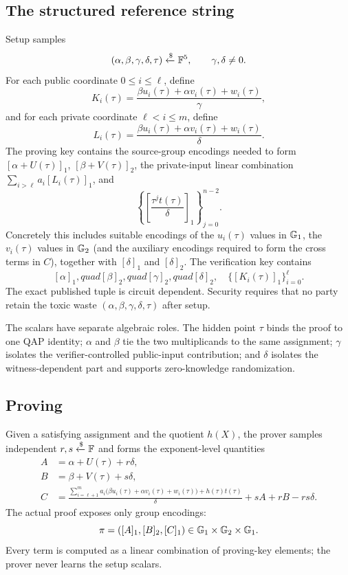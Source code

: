 \subsection{The structured reference string}

Setup samples
\[
(\alpha,\beta,\gamma,\delta,\tau)\xleftarrow{\$}\mathbb{F}^{5},
\qquad \gamma,\delta\ne 0.
\]
For each public coordinate $0\le i\le\ell$, define
\[
K_i(\tau)=
\frac{\beta u_i(\tau)+\alpha v_i(\tau)+w_i(\tau)}{\gamma},
\]
and for each private coordinate $\ell<i\le m$, define
\[
L_i(\tau)=
\frac{\beta u_i(\tau)+\alpha v_i(\tau)+w_i(\tau)}{\delta}.
\]
The proving key contains the source-group encodings needed to form
$[\alpha+U(\tau)]_1$, $[\beta+V(\tau)]_2$, the private-input linear combination $\sum_{i>\ell}a_i[L_i(\tau)]_1$, and
\[
\left\{\left[\frac{\tau^j t(\tau)}{\delta}\right]_1\right\}_{j=0}^{n-2}.
\]
Concretely this includes suitable encodings of the $u_i(\tau)$ values in $\mathbb{G}_1$, the $v_i(\tau)$ values in $\mathbb{G}_2$ (and the auxiliary encodings required to form the cross terms in $C$), together with $[\delta]_1$ and $[\delta]_2$. The verification key contains
\[
[\alpha]_1,quad [\beta]_2,quad [\gamma]_2,quad [\delta]_2,
\quad \{[K_i(\tau)]_1\}_{i=0}^{\ell}.
\]
The exact published tuple is circuit dependent. Security requires that no party retain the toxic waste $(\alpha,\beta,\gamma,\delta,\tau)$ after setup.

The scalars have separate algebraic roles. The hidden point $\tau$ binds the proof to one QAP identity; $\alpha$ and $\beta$ tie the two multiplicands to the same assignment; $\gamma$ isolates the verifier-controlled public-input contribution; and $\delta$ isolates the witness-dependent part and supports zero-knowledge randomization.

\subsection{Proving}

Given a satisfying assignment and the quotient $h(X)$, the prover samples independent $r,s\xleftarrow{\$}\mathbb{F}$ and forms the exponent-level quantities
\begin{align*}
A
  &=\alpha+U(\tau)+r\delta,\\
B
  &=\beta+V(\tau)+s\delta,\\
C
  &=\frac{\displaystyle
      \sum_{i=\ell+1}^{m}a_i
      \bigl(\beta u_i(\tau)+\alpha v_i(\tau)+w_i(\tau)\bigr)
      +h(\tau)t(\tau)}{\delta}
      +sA+rB-rs\delta.
\end{align*}
The actual proof exposes only group encodings:
\[
\pi=([A]_1,[B]_2,[C]_1)\in\mathbb{G}_1\times\mathbb{G}_2\times\mathbb{G}_1.
\]
Every term is computed as a linear combination of proving-key elements; the prover never learns the setup scalars.

